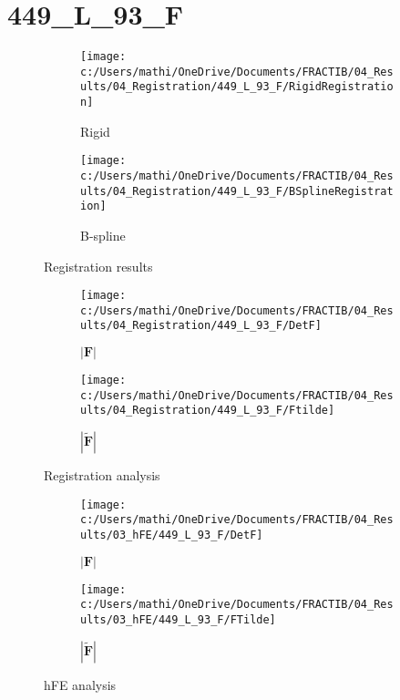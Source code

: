 \documentclass{article}%
\begin{document}
%
\newpage%
\section*{449\_L\_93\_F}%
\label{sec:449L93F}%


\begin{figure}[h!]%
\begin{subfigure}[b]{0.5\linewidth}%
\texttt{[image: c:/Users/mathi/OneDrive/Documents/FRACTIB/04\_Results/04\_Registration/449\_L\_93\_F/RigidRegistration]}%
\caption{Rigid}%
\end{subfigure}%
\begin{subfigure}[b]{0.5\linewidth}%
\texttt{[image: c:/Users/mathi/OneDrive/Documents/FRACTIB/04\_Results/04\_Registration/449\_L\_93\_F/BSplineRegistration]}%
\caption{B{-}spline}%
\end{subfigure}%
\caption{Registration results}%
\end{figure}

%


\begin{figure}[h!]%
\begin{subfigure}[b]{0.5\linewidth}%
\texttt{[image: c:/Users/mathi/OneDrive/Documents/FRACTIB/04\_Results/04\_Registration/449\_L\_93\_F/DetF]}%
\caption{$|\mathbf{F}|$}%
\end{subfigure}%
\begin{subfigure}[b]{0.5\linewidth}%
\texttt{[image: c:/Users/mathi/OneDrive/Documents/FRACTIB/04\_Results/04\_Registration/449\_L\_93\_F/Ftilde]}%
\caption{$|\widetilde{\mathbf{F}}|$}%
\end{subfigure}%
\caption{Registration analysis}%
\end{figure}

%


\begin{figure}[h!]%
\begin{subfigure}[b]{0.5\linewidth}%
\texttt{[image: c:/Users/mathi/OneDrive/Documents/FRACTIB/04\_Results/03\_hFE/449\_L\_93\_F/DetF]}%
\caption{$|\mathbf{F}|$}%
\end{subfigure}%
\begin{subfigure}[b]{0.5\linewidth}%
\texttt{[image: c:/Users/mathi/OneDrive/Documents/FRACTIB/04\_Results/03\_hFE/449\_L\_93\_F/FTilde]}%
\caption{$|\widetilde{\mathbf{F}}|$}%
\end{subfigure}%
\caption{hFE analysis}%
\end{figure}
\end{document}
